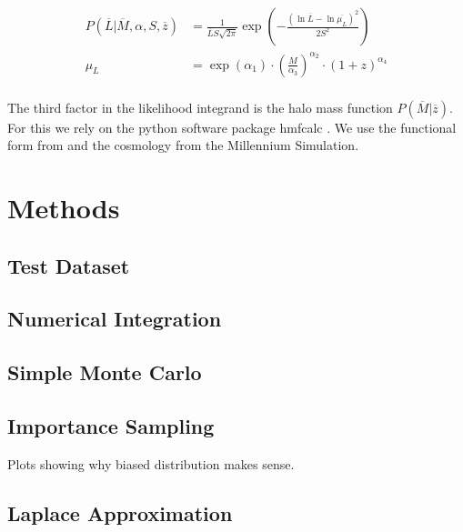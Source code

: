 \documentclass[\docopts]{\docclass}
\begin{document}
\begin{align*}
P(\overline{L}|\overline{M},\alpha,S,\overline{z}) &= \frac{1}{\overline{L}S\sqrt{2\pi}}\exp\left(-\frac{(\ln \overline{L} - \ln \overline{\mu_L})^2}{2S^{2}}\right)\\
\mu_L &= \exp(\alpha_1) \cdot \left(\frac{M}{\alpha_3}\right)^{\alpha_2} \cdot (1+z)^{\alpha_4}\\
\end{align*}

The third factor in the likelihood integrand is the halo mass function $P(\overline{M}|\overline{z})$. 
For this we rely on the python software package hmfcalc \citep*{hmf}. 
We use the functional form from \citep{tinker} and the cosmology from the Millennium Simulation.



\section{Methods}
\label{sec:methods}

\subsection{Test Dataset}
\label{subsec:testdata}

\subsection{Numerical Integration}
\label{subsec:numint}

\subsection{Simple Monte Carlo}
\label{subsec:smc}

\subsection{Importance Sampling}
\label{subsec:is}

Plots showing why biased distribution makes sense.

\subsection{Laplace Approximation}
\label{subsec:laplace}


\end{document}
